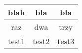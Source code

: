 \documentclass{article}
\begin{document}
\begin{tabular}{|c|c|c|}\hline
blah & bla & bla
\\
\hline
raz & dwa & trzy
\\
\hline
test1 & test2 & test3
\\
\hline
\end{tabular}
\end{document}
